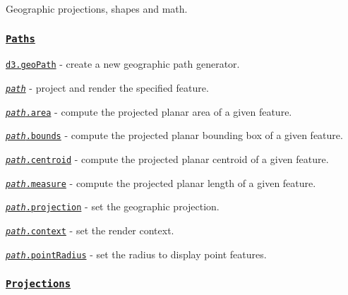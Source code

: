 Geographic projections, shapes and math.

\subsubsection*{\href{https://github.com/d3/d3-geo/blob/master/README.md#paths}{\tt Paths}}


\begin{DoxyItemize}
\item \href{https://github.com/d3/d3-geo/blob/master/README.md#geoPath}{\tt d3.\+geo\+Path} -\/ create a new geographic path generator.
\item \href{https://github.com/d3/d3-geo/blob/master/README.md#_path}{\tt {\itshape path}} -\/ project and render the specified feature.
\item \href{https://github.com/d3/d3-geo/blob/master/README.md#path_area}{\tt {\itshape path}.area} -\/ compute the projected planar area of a given feature.
\item \href{https://github.com/d3/d3-geo/blob/master/README.md#path_bounds}{\tt {\itshape path}.bounds} -\/ compute the projected planar bounding box of a given feature.
\item \href{https://github.com/d3/d3-geo/blob/master/README.md#path_centroid}{\tt {\itshape path}.centroid} -\/ compute the projected planar centroid of a given feature.
\item \href{https://github.com/d3/d3-geo/blob/master/README.md#path_measure}{\tt {\itshape path}.measure} -\/ compute the projected planar length of a given feature.
\item \href{https://github.com/d3/d3-geo/blob/master/README.md#path_projection}{\tt {\itshape path}.projection} -\/ set the geographic projection.
\item \href{https://github.com/d3/d3-geo/blob/master/README.md#path_context}{\tt {\itshape path}.context} -\/ set the render context.
\item \href{https://github.com/d3/d3-geo/blob/master/README.md#path_pointRadius}{\tt {\itshape path}.point\+Radius} -\/ set the radius to display point features.
\end{DoxyItemize}

\subsubsection*{\href{https://github.com/d3/d3-geo/blob/master/README.md#projections}{\tt Projections}}


